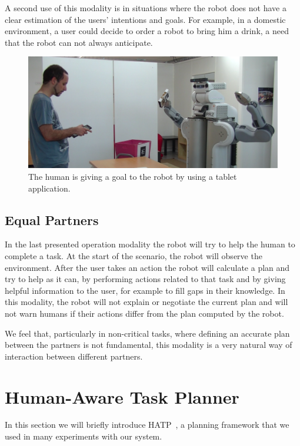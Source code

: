  A second use of this modality is in situations where
the robot does not have  a clear estimation of the users' intentions and
goals. For example, in a domestic environment, a user could decide to
order a robot to bring him a drink, a need that the robot can not always anticipate.

\begin{figure}[ht!]
 \centering
 \includegraphics[scale=0.25]{img/coworker/plan_management/tablet.pdf}
 \caption[Giving goals to the robot]{The human is giving a goal to the robot by using a tablet application.}
 \label{fig:plan_management-tablet}
 \end{figure}

\subsection{Equal Partners}
In the last presented operation modality the robot will try to help
the human to complete a task. At the start of the scenario, the robot
will observe the environment. After the user takes an
action the robot will calculate a plan and try to help as it can, by
performing actions related to that task and by giving helpful information to
the user, for example to fill gaps in their knowledge. In this modality, 
the robot will not explain or negotiate the current plan and will not warn humans if
their actions differ from the plan computed by the robot.

We feel that, particularly in non-critical tasks, where defining an accurate plan between the partners is not
fundamental, this modality is a very natural way of
interaction between different partners.



\section{Human-Aware Task Planner}
\label{sec:plan_management-hatp}
In this section we will briefly introduce HATP~\citep{Lallement2014}, a planning framework that we used in many experiments with our system.

